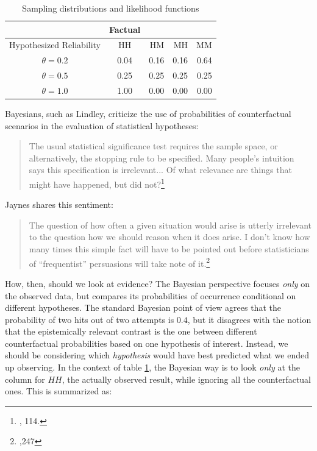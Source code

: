 \begin{table}[]
\centering
  \caption{Sampling distributions and likelihood functions}
   \label{tab:likelihoodvscf}
\begin{tabular}{@{}c||c|rrr@{}}
\toprule
 & Factual & \multicolumn{3}{l}{} Counterfactual\\ \midrule
Hypothesized Reliability & HH & HM      & MH      &  MM    \\\midrule
$\theta=0.2$ & 0.04 &   0.16    &   0.16    &    0.64  \\
 $\theta=0.5$& 0.25 &    0.25   &   0.25    &    0.25  \\
 $\theta=1.0$& 1.00 &   0.00    &   0.00    &   0.00   \\ \bottomrule
\end{tabular}
 

\end{table}

Bayesians, such as Lindley, criticize the use of probabilities of counterfactual scenarios in the evaluation of statistical hypotheses:


\begin{quote}
The usual statistical significance test requires the sample space, or alternatively, the stopping rule to be specified. Many people's intuition says this specification is irrelevant... Of what relevance are things that might have happened, but did not?\footnote{\cite{lindleybern}, 114.}
\end{quote}

Jaynes shares this sentiment:

\begin{quote}
The question of how often a given situation would arise is utterly
irrelevant to the question how we should reason when it does arise. I
don't know how many times this simple fact will have to be pointed out
before statisticians of ``frequentist'' persuasions will take note of
it.\footnote{\cite{jaynesmight},247}
\end{quote}

How, then, should we look at evidence? The Bayesian perspective focuses \emph{only} on the observed data, but compares its probabilities of occurrence conditional on different hypotheses. The standard Bayesian point of view agrees that the probability of two hits out of two attempts is $0.4$, but it disagrees with the notion that the epistemically relevant contrast is the one between different counterfactual probabilities based on one hypothesis of interest. Instead, we should be considering which \emph{hypothesis} would have best predicted what we ended up observing. In the context of table \ref{tab:likelihoodvscf}, the Bayesian way is to look \emph{only} at the column for $HH$, the actually observed result, while ignoring all the counterfactual ones. This is summarized as: 

